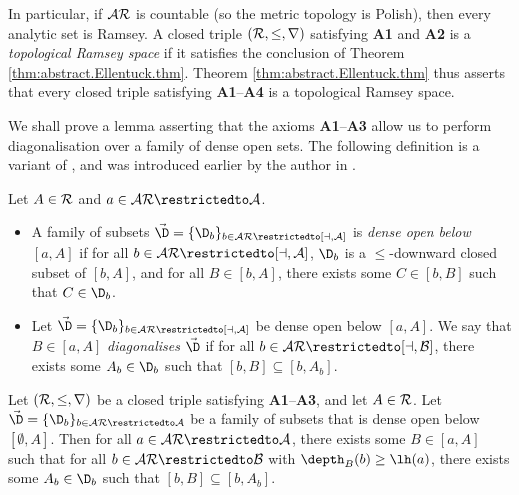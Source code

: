 \documentclass[11pt,reqno]{amsart}
\begin{document}
In particular, if $\cal{AR}$ is countable (so the metric topology is Polish), then every analytic set is Ramsey. A closed triple $(\cal{R},\leq,r)$ satisfying \textbf{A1} and \textbf{A2} is a \emph{topological Ramsey space} if it satisfies the conclusion of Theorem \ref{thm:abstract.Ellentuck.thm}. Theorem \ref{thm:abstract.Ellentuck.thm} thus asserts that every closed triple satisfying \textbf{A1}--\textbf{A4} is a topological Ramsey space.

We shall prove a lemma asserting that the axioms \textbf{A1}--\textbf{A3} allow us to perform diagonalisation over a family of dense open sets. The following definition is a variant of \cite[Definition 3.6]{DMN15}, and was introduced earlier by the author in \cite{Y24,Y25}.

\begin{definition}
\label{def:dense.open.diagonalisation}
    Let $A \in \cal{R}$ and $a \in \cal{AR}\restrictedto A$.
    \begin{itemize}
        \item A family of subsets $\vec{\D} = \{\D_b\}_{b \in \cal{AR}\restrictedto[a,A]}$ is \emph{dense open below $[a,A]$} if for all $b \in \cal{AR}\restrictedto[a,A]$, $\D_b$ is a $\leq$-downward closed subset of $[b,A]$, and for all $B \in [b,A]$, there exists some $C \in [b,B]$ such that $C \in \D_b$.
        
        \item Let $\vec{\D} = \{\D_b\}_{b \in \cal{AR}\restrictedto[a,A]}$ be dense open below $[a,A]$. We say that $B \in [a,A]$ \emph{diagonalises} $\vec{\D}$ if for all $b \in \cal{AR}\restrictedto[a,B]$, there exists some $A_b \in \D_b$ such that $[b,B] \subseteq [b,A_b]$.
    \end{itemize}
\end{definition}

\begin{lemma}
\label{lem:R.is.semiselective.improved}
    Let $(\cal{R},\leq,r)$ be a closed triple satisfying \textbf{A1}--\textbf{A3}, and let $A \in \cal{R}$. Let $\vec{\D} = \{\D_b\}_{b\in\cal{AR}\restrictedto A}$ be a family of subsets that is dense open below $[\emptyset,A]$. Then for all $a \in \cal{AR}\restrictedto A$, there exists some $B \in [a,A]$ such that for all $b \in \cal{AR}\restrictedto B$ with $\depth_B(b) \geq \lh(a)$, there exists some $A_b \in \D_b$ such that $[b,B] \subseteq [b,A_b]$.
\end{lemma}
\end{document}
